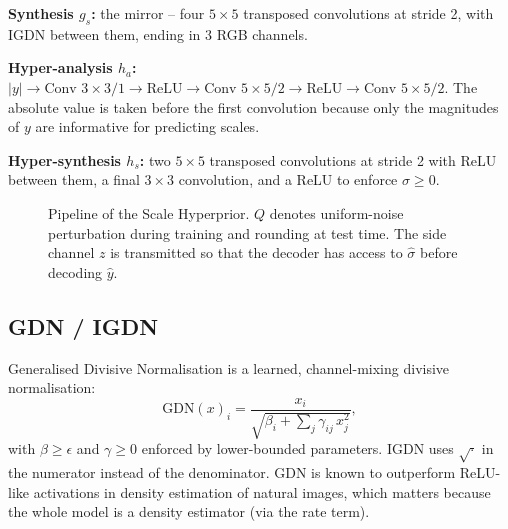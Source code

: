 \documentclass[review]{elsarticle}
\begin{document}
\textbf{Synthesis $g_s$:} the mirror -- four $5\times 5$ transposed convolutions at stride 2, with IGDN between them, ending in 3 RGB channels.

\textbf{Hyper-analysis $h_a$:} $|y| \to \text{Conv } 3\times 3/1 \to \text{ReLU} \to \text{Conv } 5\times 5/2 \to \text{ReLU} \to \text{Conv } 5\times 5/2$. The absolute value is taken before the first convolution because only the magnitudes of $y$ are informative for predicting scales.

\textbf{Hyper-synthesis $h_s$:} two $5\times 5$ transposed convolutions at stride 2 with ReLU between them, a final $3\times 3$ convolution, and a ReLU to enforce $\sigma \ge 0$.

\begin{figure}[htbp]
\centering
{}
\caption{Pipeline of the Scale Hyperprior. $Q$ denotes uniform-noise perturbation during training and rounding at test time. The side channel $z$ is transmitted so that the decoder has access to $\hat\sigma$ before decoding $\hat y$.}
\label{fig:pipeline}
\end{figure}

\subsection{GDN / IGDN}
Generalised Divisive Normalisation \cite{balle2016gdn} is a learned, channel-mixing divisive normalisation:
\begin{equation}
\mathrm{GDN}(x)_i = \frac{x_i}{\sqrt{\beta_i + \sum_j \gamma_{ij}\, x_j^2}},
\end{equation}
with $\beta \ge \epsilon$ and $\gamma \ge 0$ enforced by lower-bounded parameters. IGDN uses $\sqrt{\cdot}$ in the numerator instead of the denominator. GDN is known to outperform ReLU-like activations in density estimation of natural images, which matters because the whole model is a density estimator (via the rate term).
\end{document}
